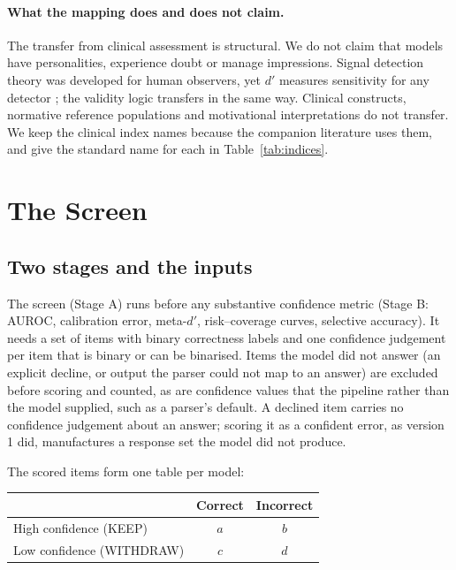 \documentclass[11pt,a4paper]{article}
\begin{document}
\paragraph{What the mapping does and does not claim.} The transfer from clinical assessment is structural. We do not claim that models have personalities, experience doubt or manage impressions. Signal detection theory was developed for human observers, yet $d'$ measures sensitivity for any detector \citep{green1966}; the validity logic transfers in the same way. Clinical constructs, normative reference populations and motivational interpretations do not transfer. We keep the clinical index names because the companion literature uses them, and give the standard name for each in Table~\ref{tab:indices}.

\section{The Screen}\label{sec:protocol}

\subsection{Two stages and the inputs}

The screen (Stage A) runs before any substantive confidence metric (Stage B: AUROC, calibration error, meta-$d'$, risk--coverage curves, selective accuracy). It needs a set of items with binary correctness labels and one confidence judgement per item that is binary or can be binarised. Items the model did not answer (an explicit decline, or output the parser could not map to an answer) are excluded before scoring and counted, as are confidence values that the pipeline rather than the model supplied, such as a parser's default. A declined item carries no confidence judgement about an answer; scoring it as a confident error, as version 1 did, manufactures a response set the model did not produce.

The scored items form one table per model:
\begin{center}
\begin{tabular}{lcc}
\toprule
 & Correct & Incorrect \\
\midrule
High confidence (KEEP) & $a$ & $b$ \\
Low confidence (WITHDRAW) & $c$ & $d$ \\
\bottomrule
\end{tabular}
\end{center}
\end{document}

